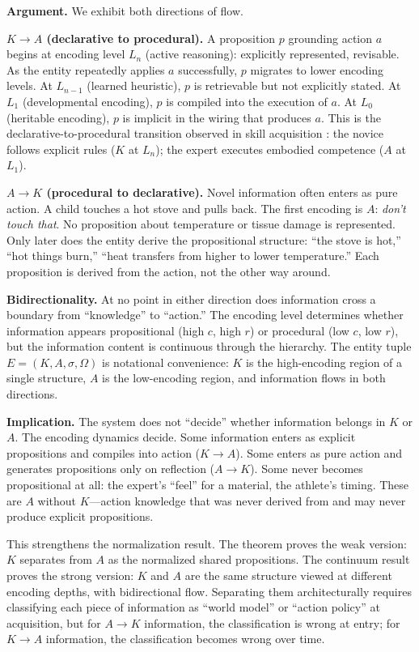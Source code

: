 \documentclass[11pt]{article}
\theoremstyle{definition}
\theoremstyle{remark}
\begin{document}
\textbf{Argument.}
We exhibit both directions of flow.

\textbf{$K \to A$ (declarative to procedural).}
A proposition $p$ grounding action $a$ begins at encoding level $L_n$
(active reasoning): explicitly represented, revisable. As the entity
repeatedly applies $a$ successfully, $p$ migrates to lower encoding
levels. At $L_{n-1}$ (learned heuristic), $p$ is retrievable but not
explicitly stated. At $L_1$ (developmental encoding), $p$ is compiled
into the execution of $a$. At $L_0$ (heritable encoding), $p$ is
implicit in the wiring that produces $a$. This is the
declarative-to-procedural transition observed in skill acquisition
\cite{FittsPosner1967}: the novice follows explicit rules ($K$ at
$L_n$); the expert executes embodied competence ($A$ at $L_1$).

\textbf{$A \to K$ (procedural to declarative).}
Novel information often enters as pure action. A child touches a hot
stove and pulls back. The first encoding is $A$: \emph{don't touch
that}. No proposition about temperature or tissue damage is represented.
Only later does the entity derive the propositional structure: ``the
stove is hot,'' ``hot things burn,'' ``heat transfers from higher to
lower temperature.'' Each proposition is derived from the action, not
the other way around.

\textbf{Bidirectionality.}
At no point in either direction does information cross a boundary from
``knowledge'' to ``action.'' The encoding level determines whether
information appears propositional (high $c$, high $r$) or procedural
(low $c$, low $r$), but the information content is continuous through the
hierarchy. The entity tuple $E = (K, A, \sigma, \Omega)$ is notational
convenience: $K$ is the high-encoding region of a single structure, $A$
is the low-encoding region, and information flows in both directions.

\textbf{Implication.} The system does not ``decide'' whether information
belongs in $K$ or $A$. The encoding dynamics decide. Some information
enters as explicit propositions and compiles into action ($K \to A$).
Some enters as pure action and generates propositions only on reflection
($A \to K$). Some never becomes propositional at all: the expert's
``feel'' for a material, the athlete's timing. These are $A$ without
$K$---action knowledge that was never derived from and may never produce
explicit propositions.

This strengthens the normalization result. The theorem proves the weak
version: $K$ separates from $A$ as the normalized shared propositions.
The continuum result proves the strong version: $K$ and $A$ are the same
structure viewed at different encoding depths, with bidirectional flow.
Separating them architecturally requires classifying each piece of
information as ``world model'' or ``action policy'' at acquisition, but
for $A \to K$ information, the classification is wrong at entry; for
$K \to A$ information, the classification becomes wrong over time.
\end{document}
